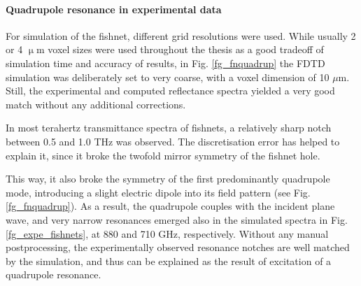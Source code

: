 \paragraph{Quadrupole resonance in experimental data}%
For simulation of the fishnet, different grid resolutions were used. While usually 2 or 4 $\upmu$m voxel sizes were used throughout the thesis as a good tradeoff of simulation time and accuracy of results, in Fig.  \ref{fg_fnquadrup} the FDTD simulation was deliberately set to very coarse, with a voxel dimension of 10 $\mu$m. Still, the experimental and computed reflectance spectra yielded a very good match without any additional corrections.

In most terahertz transmittance spectra of fishnets, a relatively sharp notch between 0.5 and 1.0 THz was observed. The discretisation error has helped to explain it, since it broke the twofold mirror symmetry of the fishnet hole. 

This way, it also broke the symmetry of the first predominantly quadrupole mode, introducing a slight electric dipole into its field pattern  (see Fig. \ref{fg_fnquadrup}). As a result, the quadrupole couples with the incident plane wave, and very narrow resonances emerged also in the simulated spectra in Fig. \ref{fg_expe_fishnets}, at 880 and 710 GHz, respectively. Without any manual postprocessing, the experimentally observed resonance notches are well matched by the simulation, and thus can be explained as the result of excitation of a quadrupole resonance.   %

 

